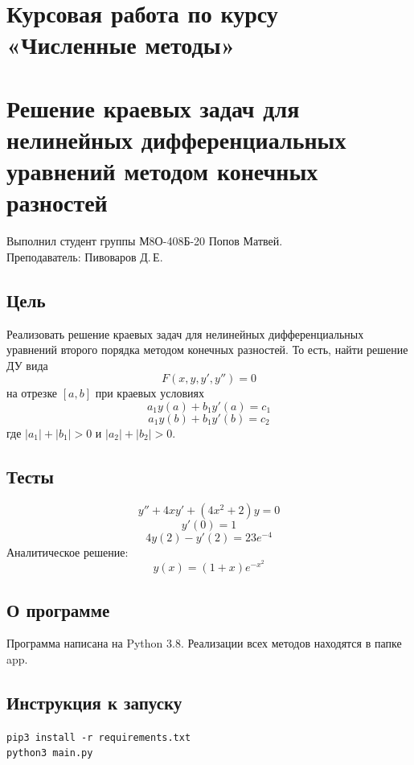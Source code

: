 \documentclass{article}
\begin{document}
\section*{Курсовая работа по курсу «Численные методы»}
\section*{Решение краевых задач для нелинейных дифференциальных уравнений 
методом конечных разностей}

Выполнил студент группы М8О-408Б-20 Попов Матвей.
\\
Преподаватель: Пивоваров Д.\,Е.

\subsection*{Цель}

Реализовать решение краевых задач для нелинейных дифференциальных уравнений 
второго порядка методом конечных разностей. То есть, найти решение ДУ вида 
$$F(x, y, y', y'') = 0$$
на отрезке $[a, b]$ при краевых условиях
$$a_1 y(a) + b_1 y'(a) = c_1$$
$$a_1 y(b) + b_1 y'(b) = c_2$$
где $|a_1| + |b_1| > 0$ и $|a_2| + |b_2| > 0$.

\subsection*{Тесты}
$$y'' + 4xy' + (4x^2 + 2)y = 0$$
$$y'(0) = 1$$
$$4y(2) - y'(2) = 23e^{-4}$$
Аналитическое решение:
$$y(x) = (1 + x)e^{-x^2}$$

\subsection*{О программе}
Программа написана на Python 3.8. Реализации всех методов находятся в папке 
app.

\subsection*{Инструкция к запуску}
\texttt{pip3 install -r requirements.txt}\\
\texttt{python3 main.py}\\
\end{document}
